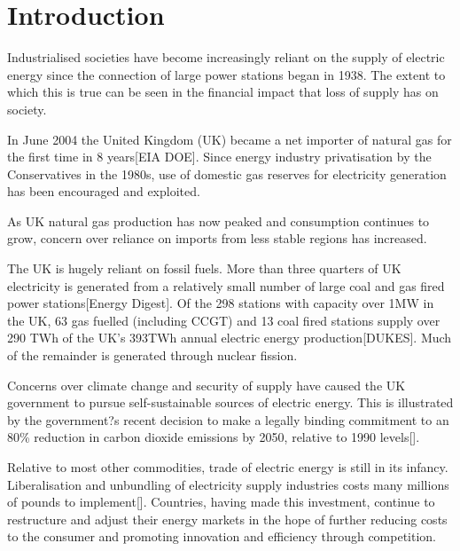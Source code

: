 \section{Introduction}
Industrialised societies have become increasingly reliant on the supply of
electric energy since the connection of large power stations began in 1938.
The extent to which this is true can be seen in the financial impact that loss
of supply has on society.


In June 2004 the United Kingdom (UK) became a net importer of natural gas for
the first time in 8 years[EIA DOE].  Since energy industry privatisation by
the Conservatives in the 1980s, use of domestic gas reserves for electricity
generation has been encouraged and exploited.


As UK natural gas production has now peaked and consumption continues to grow,
concern over reliance on imports from less stable regions has increased.

The UK is hugely reliant on fossil fuels.  More than three quarters of UK
electricity is generated from a relatively small number of large coal and gas
fired power stations[Energy Digest].  Of the 298 stations with capacity over
1MW in the UK, 63 gas fuelled (including CCGT) and 13 coal fired stations
supply over 290 TWh of the UK's 393TWh annual electric energy
production[DUKES].  Much of the remainder is generated through nuclear
fission.


Concerns over climate change and security of supply have caused the UK
government to pursue self-sustainable sources of electric energy.  This is
illustrated by the government?s recent decision to make a legally binding
commitment to an 80\% reduction in carbon dioxide emissions by 2050, relative
to 1990 levels[].


Relative to most other commodities, trade of electric energy is still in its
infancy.  Liberalisation and unbundling of electricity supply industries costs
many millions of pounds to implement[].  Countries, having made this
investment, continue to restructure and adjust their energy markets in the
hope of further reducing costs to the consumer and promoting innovation and
efficiency through competition.


